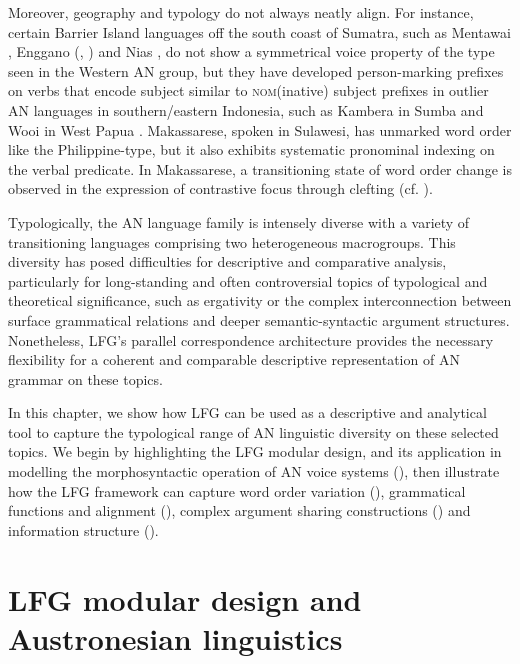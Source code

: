 \documentclass[output=paper,chinesefont]{../langscibook}
\begin{document}
Moreover, geography and typology do not always neatly align. For instance, certain Barrier Island languages off the south coast of Sumatra, such as Mentawai \citep{Lenggang1978,Arka2006}, Enggano (\citealt{Crowley:Enggano}{,} \citealt{Hemmings:Enggano}) and Nias \citep{Brown2001}, do not show a symmetrical voice property of the type seen in the Western AN group, but they have developed person-marking prefixes on verbs that encode subject similar to \textsc{nom}(inative) subject prefixes in outlier AN languages in southern/eastern Indonesia, such as Kambera in Sumba \citep{Klamer1998} and Wooi in West Papua \citep{Sawaki2016}. Makassarese, spoken in Sulawesi, has unmarked word order like the Philippine-type, but it also exhibits systematic pronominal indexing on the verbal predicate. In Makassarese, a transitioning state of word order change is observed in the expression of contrastive focus through clefting (cf. ).

Typologically, the AN language family is intensely diverse with a variety of transitioning languages comprising two heterogeneous macrogroups. This diversity has posed difficulties for descriptive and comparative analysis, particularly for long-standing and often controversial topics of typological and theoretical significance, such as ergativity or the complex interconnection between surface grammatical relations and deeper semantic-syntactic argument structures. Nonetheless, LFG's parallel correspondence architecture provides the necessary flexibility for a coherent and comparable descriptive representation of AN grammar on these topics.

In this chapter, we show how LFG can be used as a descriptive and analytical tool to capture the typological range of AN linguistic diversity on these selected topics. We begin by highlighting the LFG modular design, and its application in modelling the morphosyntactic operation of AN voice systems (), then illustrate how the LFG framework can capture word order variation (), grammatical functions and alignment (), complex argument sharing constructions () and information structure ().

\section{LFG modular design and Austronesian linguistics}
\label{sec:Austronesian:2}
\end{document}
